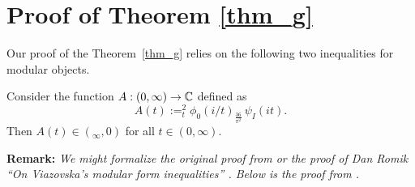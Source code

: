 \section{Proof of Theorem \ref{thm_g}}\label{sec: g}
Our proof of the Theorem~\ref{thm_g} relies on the following two inequalities for modular objects.
\begin{proposition}\label{prop: inequalities A}
Consider the function $A:(0,\infty)\to\mathbb{C}$ defined as
$$A(t):=_t^2\phi_0(i/t)_\frac{36}{\pi^2}\,\psi_I(it).$$
Then $A(t)\in(_\infty,0)$ for all $t\in(0,\infty).$
\end{proposition}

\noindent \textbf{Remark:} \emph{We might formalize the  original proof from \cite{Via2017} or the proof of Dan Romik ``On Viazovska’s modular form inequalities'' \cite{Romik2023}. Below is the proof from \cite{Via2017}.}
